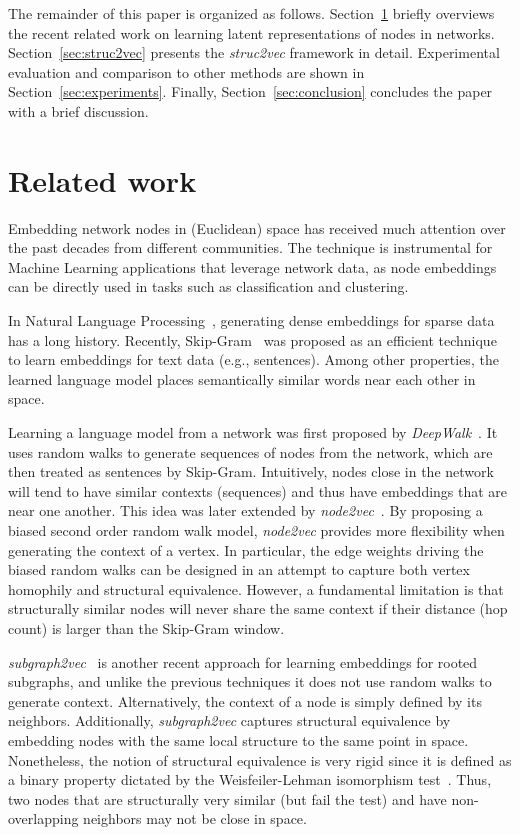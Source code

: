 \documentclass[sigconf]{acmart}
\begin{document}
The remainder of this paper is organized as follows. Section~\ref{sec:related} briefly overviews the recent related work on learning latent representations of nodes in networks. Section~\ref{sec:struc2vec} presents the \textit{struc2vec} framework in detail. Experimental evaluation and comparison to other methods are shown in Section~\ref{sec:experiments}. Finally, Section~\ref{sec:conclusion} concludes the paper with a brief discussion.
 \section{Related work} \label{sec:related}
Embedding network nodes in (Euclidean) space has received much attention over the past decades from different communities. The technique is instrumental for Machine Learning applications that leverage network data, as node embeddings can be directly used in tasks such as classification and clustering. 

In Natural Language Processing~\cite{nnlm}, generating dense embeddings for sparse data has a long history. Recently, Skip-Gram~\cite{word2vecmiko,skipgram-mikolov} was proposed as an efficient technique to learn embeddings for text data (e.g., sentences). Among other properties,
the learned language model places semantically similar words near each other in space.

Learning a language model from a network was first proposed by \textit{DeepWalk}~\cite{Perozzi2014}. It uses random walks to generate sequences of nodes from the network, which are then treated as sentences by Skip-Gram. Intuitively, nodes close in the network will tend to have similar contexts (sequences) and thus have embeddings that are near one another. This idea was later extended by \textit{node2vec}~\cite{node2vec-kdd2016}. By proposing a biased second order random walk model, \textit{node2vec} provides more flexibility when generating the context of a vertex. In particular, the edge weights driving the biased random walks can be designed in an attempt to capture both vertex homophily and structural equivalence. However, a fundamental limitation is that structurally similar nodes will never share the same context if their distance (hop count) is larger than the Skip-Gram window. 

\textit{subgraph2vec}~\cite{subgraph2vec} is another recent approach for learning embeddings for rooted subgraphs, and unlike the previous techniques it does not use random walks to generate context. Alternatively, the context of a node is simply defined by its neighbors. Additionally, \textit{subgraph2vec} captures structural equivalence by embedding nodes with the same local structure to the same point in space. Nonetheless, the notion of structural equivalence is very rigid since it is defined as a binary property dictated by the Weisfeiler-Lehman isomorphism test~\cite{wlkernel}. Thus, two nodes that are structurally very similar (but fail the test) and have non-overlapping neighbors may not be close in space. 
\end{document}
